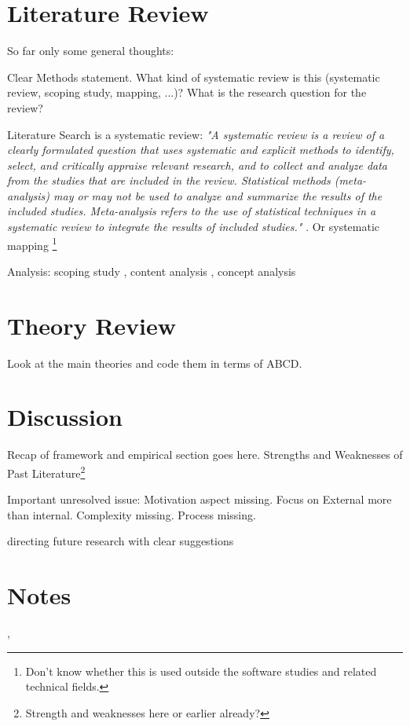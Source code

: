 \documentclass[nobib]{tufte-handout}
\begin{document}
\section{Literature Review}

So far only some general thoughts:

Clear Methods statement. What kind of systematic review is this (systematic review, scoping study, mapping, ...)? What is the research question for the review?

Literature Search is a systematic review: \textit{"A systematic review is a review of a clearly formulated question that uses systematic and explicit methods to identify, select, and critically appraise relevant research, and to collect and analyze data from the studies that are included in the review. Statistical methods (meta-analysis) may or may not be used to analyze and summarize the results of the included studies. Meta-analysis refers to the use of statistical techniques in a systematic review to integrate the results of included studies."} \citep[p.1]{Moher2009}. Or systematic mapping \citep{Petersen2015}\footnote{Don't know whether this is used outside the software studies and related technical fields.}

Analysis: scoping study \citep{Arksey2005},  content analysis \citep{Mikkonen2020, Yoon2011}, concept analysis \citep{Siatkowski2007}

\section{Theory Review}
Look at the main theories and code them in terms of ABCD.

\section{Discussion}

 Recap of framework and empirical section goes here. Strengths and Weaknesses of Past Literature\footnote{Strength and weaknesses here or earlier already?}

 Important unresolved issue: Motivation aspect missing. Focus on External more than internal. Complexity missing. Process missing. 

 directing future research with clear suggestions

\section{Notes}
 \citet{Dirth2018}
 \citet{Yoon2011}, \citet{Siatkowski2007}

\newpage
\printbibliography
\end{document}
